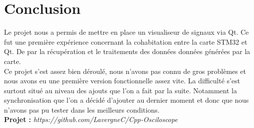 \documentclass[11pt, french]{article}
\begin{document}
\newpage

\section{Conclusion}

Le projet nous a permis de mettre en place un visualiseur de signaux via Qt. Ce fut une première expérience concernant la cohabitation entre la carte STM32 et Qt. De par la récupération et le traitements des données données générées par la carte.\\

Ce projet s'est assez bien déroulé, nous n'avons pas connu de gros problèmes et nous avons eu une première version fonctionnelle assez vite. La difficulté s'est surtout situé au niveau des ajouts que l'on a fait par la suite. Notamment la synchronisation que l'on a décidé d'ajouter au dernier moment et donc que nous n'avons pas pu tester dans les meilleurs conditions.\\


\textbf{Projet :} \emph{https://github.com/LavergneC/Cpp-Osciloscope}
\end{document}
